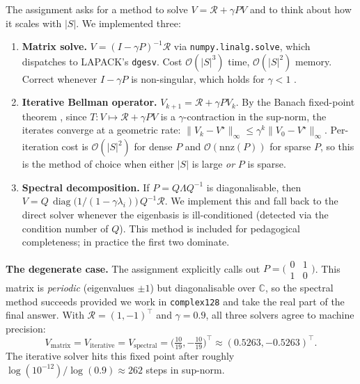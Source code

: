 \documentclass[11pt]{article}
\begin{document}
The assignment asks for a method to solve $V = \mathcal{R} + \gamma P V$
and to think about how it scales with $|S|$. We implemented three:
\begin{enumerate}[leftmargin=2em, itemsep=2pt]
  \item \textbf{Matrix solve.}
    $V = (I - \gamma P)^{-1} \mathcal{R}$ via
    \texttt{numpy.linalg.solve}, which dispatches to LAPACK's
    \texttt{dgesv}. Cost $\mathcal{O}(|S|^3)$ time, $\mathcal{O}(|S|^2)$
    memory. Correct whenever $I-\gamma P$ is non-singular, which holds
    for $\gamma<1$ \citep{puterman1994}.
  \item \textbf{Iterative Bellman operator.}
    $V_{k+1} = \mathcal{R} + \gamma P V_k$. By the Banach fixed-point
    theorem \citep{banach1922}, since $T : V \!\mapsto\!
    \mathcal{R} + \gamma P V$ is a $\gamma$-contraction in the
    sup-norm, the iterates converge at a geometric rate:
    $\|V_k - V^\star\|_\infty \le \gamma^k \|V_0 - V^\star\|_\infty$.
    Per-iteration cost is $\mathcal{O}(|S|^2)$ for dense $P$ and
    $\mathcal{O}(\text{nnz}(P))$ for sparse $P$, so this is the method
    of choice when either $|S|$ is large \emph{or} $P$ is sparse.
  \item \textbf{Spectral decomposition.}
    If $P = Q\Lambda Q^{-1}$ is diagonalisable, then
    $V = Q\,\operatorname{diag}\!\bigl(1/(1-\gamma\lambda_i)\bigr)\,Q^{-1}
    \mathcal{R}$. We implement this and fall back to the direct solver
    whenever the eigenbasis is ill-conditioned (detected via the
    condition number of $Q$). This method is included for pedagogical
    completeness; in practice the first two dominate.
\end{enumerate}

\textbf{The degenerate case.}
The assignment explicitly calls out
$P=\bigl(\begin{smallmatrix}0 & 1\\ 1 & 0\end{smallmatrix}\bigr)$. This
matrix is \emph{periodic} (eigenvalues $\pm 1$) but diagonalisable over
$\mathbb{C}$, so the spectral method succeeds provided we work in
\texttt{complex128} and take the real part of the final answer. With
$\mathcal{R}=(1,-1)^\top$ and $\gamma=0.9$, all three solvers agree to
machine precision:
\begin{equation*}
  V_{\text{matrix}} = V_{\text{iterative}} = V_{\text{spectral}} =
  \bigl(\tfrac{10}{19}, -\tfrac{10}{19}\bigr)^\top
  \approx (0.5263, -0.5263)^\top.
\end{equation*}
The iterative solver hits this fixed point after roughly $\log(10^{-12})/\log(0.9)\!\approx\!262$
steps in sup-norm.
\end{document}
